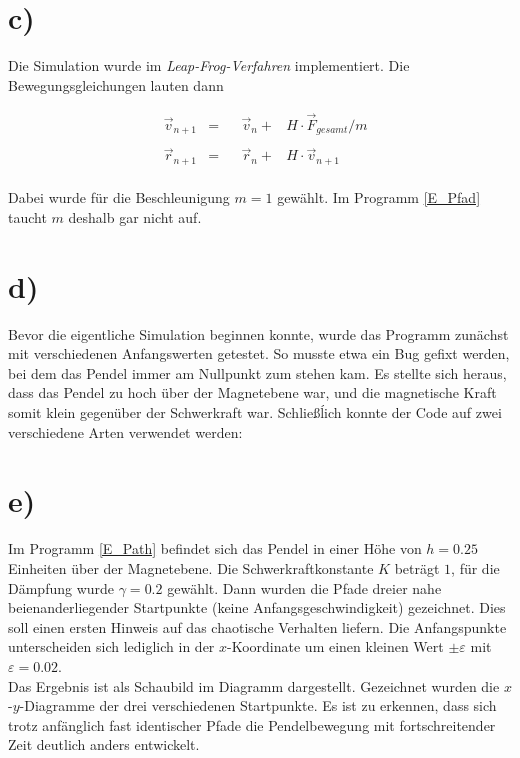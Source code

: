 \section*{c)}
Die Simulation wurde im \textit{Leap-Frog-Verfahren} implementiert. Die Bewegungsgleichungen lauten dann

\begin{align}
&\vec{v}_{n+1} &=& &\vec{v}_n + &H \cdot \vec{F}_{gesamt} / m \\\\
&\vec{r}_{n+1} &=& &\vec{r}_n + &H \cdot \vec{v}_{n+1}
\end{align}
\\
Dabei wurde für die Beschleunigung $m=1$ gewählt. Im Programm \ref{E_Pfad} taucht $m$ deshalb gar nicht auf.

\section*{d)}
Bevor die eigentliche Simulation beginnen konnte, wurde das Programm zunächst mit verschiedenen Anfangswerten getestet. So musste etwa ein Bug gefixt werden, bei dem das Pendel immer am Nullpunkt zum stehen kam. Es stellte sich heraus, dass das Pendel zu hoch über der Magnetebene war, und die magnetische Kraft somit klein gegenüber der Schwerkraft war. Schließĺich konnte der Code auf zwei verschiedene Arten verwendet werden:

\section{e)}
Im Programm \ref{E_Path} befindet sich das Pendel in einer Höhe von $h=0.25$ Einheiten über der Magnetebene. Die Schwerkraftkonstante $K$ beträgt $1$, für die Dämpfung wurde $\gamma = 0.2$ gewählt. Dann wurden die Pfade dreier nahe beienanderliegender Startpunkte (keine Anfangsgeschwindigkeit) gezeichnet. Dies soll einen ersten Hinweis auf das chaotische Verhalten liefern. Die Anfangspunkte unterscheiden sich lediglich in der $x$-Koordinate um einen kleinen Wert $\pm \varepsilon$ mit $\varepsilon = 0.02$.\\
Das Ergebnis ist als Schaubild im Diagramm \label{fig:xy} dargestellt. Gezeichnet wurden die $x$-$y$-Diagramme der drei verschiedenen Startpunkte. Es ist zu erkennen, dass sich trotz anfänglich fast identischer Pfade die Pendelbewegung mit fortschreitender Zeit deutlich anders entwickelt.

